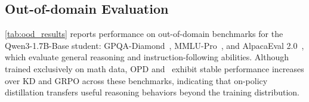 \begin{table}[ht]
\centering
\caption{Out-of-domain benchmark results on Qwen3-1.7B-Base, covering general reasoning and instruction following.
Our method achieves higher average accuracy and pass@8 on general reasoning, and is competitive or superior in win rate (\textit{WR}) and length-controlled win rate (\textit{LC-WR}). Best and second-best results are shown in \textbf{bold} and \underline{underline}, respectively.}
\vspace{-3mm}
\label{tab:ood_results}
\end{table}

\subsection{Out-of-domain Evaluation} \label{sec:ood}
\autoref{tab:ood_results} reports performance on out-of-domain benchmarks for the Qwen3-1.7B-Base student: GPQA-Diamond~\cite{rein2024gpqa}, MMLU-Pro~\cite{wang2024mmlu}, and AlpacaEval 2.0~\cite{dubois2024length}, which evaluate general reasoning and instruction-following abilities. Although trained exclusively on math data, OPD and \method~exhibit stable performance increases over KD and GRPO across these benchmarks, indicating that on-policy distillation transfers useful reasoning behaviors beyond the training distribution.

